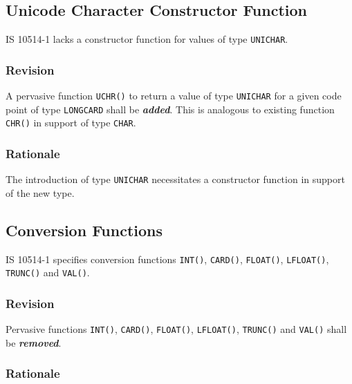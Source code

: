 \documentclass[10pt,a4paper,leqno,fleqn]{article}
\renewcommand{\emph}[1]{\textbf{\textit{#1}}}
\begin{document}
\subsection{Unicode Character Constructor Function}

IS 10514-1 lacks a constructor function for values of type \texttt{UNICHAR}.

\subsubsection{Revision}

A pervasive function \texttt{UCHR()} to return a value of type \texttt{UNICHAR}
for a given code point of type \texttt{LONGCARD} shall be \emph{added}.
This is analogous to existing function \texttt{CHR()} in support of type
\texttt{CHAR}.

\subsubsection{Rationale}

The introduction of type \texttt{UNICHAR} necessitates a constructor function
in support of the new type.


\subsection{Conversion Functions}

IS 10514-1 specifies conversion functions \verb|INT()|, \verb|CARD()|,
\verb|FLOAT()|, \verb|LFLOAT()|, \verb|TRUNC()| and \verb|VAL()|.

\subsubsection{Revision}

Pervasive functions \verb|INT()|, \verb|CARD()|, \verb|FLOAT()|,
\verb|LFLOAT()|, \verb|TRUNC()| and \verb|VAL()| shall be \emph{removed}.

\subsubsection{Rationale}
\end{document}

